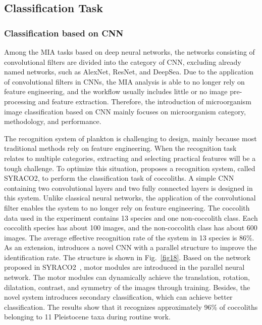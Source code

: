 \subsection{Classification Task}

\subsubsection{Classification based on CNN}

Among the MIA tasks based on deep neural networks, the networks consisting of convolutional filters are divided into the category of CNN, excluding already named networks, such as AlexNet, ResNet, and DeepSea. Due to the application of convolutional filters in CNNs, the MIA analysis is able to no longer rely on feature engineering, and the workflow usually includes little or no image pre-processing and feature extraction. Therefore, the introduction of microorganism image classification based on CNN mainly focuses on microorganism category, methodology, and performance.


The recognition system of plankton is challenging to design, mainly because most traditional methods rely on feature engineering. When the recognition task relates to multiple categories, extracting and selecting practical features will be a tough challenge. To optimize this situation, \cite{Dollfus-1999-FNNR} proposes a recognition system, called SYRACO2, to perform the classification task of coccoliths. A simple CNN containing two convolutional layers and two fully connected layers is designed in this system. Unlike classical neural networks, the application of the convolutional filter enables the system to no longer rely on feature engineering. The coccolith data used in the experiment contains 13 species and one non-coccolith class. Each coccolith species has about 100 images, and the non-coccolith class has about 600 images. The average effective recognition rate of the system in 13 species is 86\%. As an extension, \cite{Beaufort-2004-ARCD} introduces a novel CNN with a parallel structure to improve the identification rate. The structure is shown in Fig.~\ref{fig18}. Based on the network proposed in SYRACO2~\cite{Dollfus-1999-FNNR}, motor modules are introduced in the parallel neural network. The motor modules can dynamically achieve the translation, rotation, dilatation, contrast, and symmetry of the images through training. Besides, the novel system introduces secondary classification, which can achieve better classification. The results show that it recognizes approximately 96\% of coccoliths belonging to 11 Pleistocene taxa during routine work.



